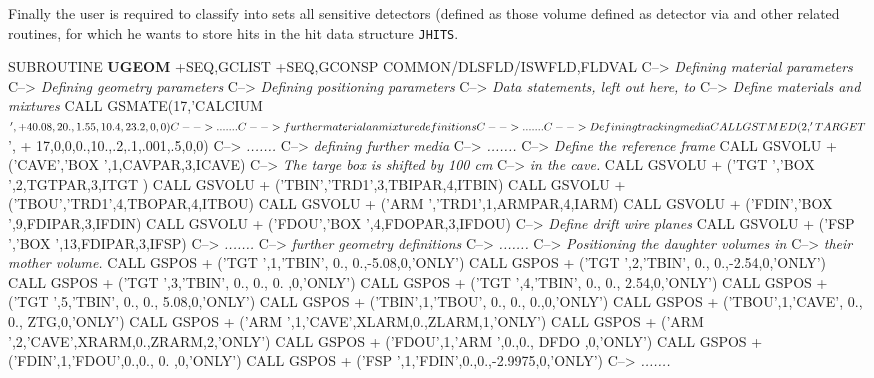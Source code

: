 \begin{itemize}
Finally the user is required to classify into sets all
sensitive detectors (defined as those volume defined as
detector via  and other related routines, for which 
he wants to store hits in the hit data structure {\tt JHITS}.
\begin{multicols}{2}
\footnotesize
\begin{XMP}
      SUBROUTINE {\bf UGEOM}
+SEQ,GCLIST
+SEQ,GCONSP
      COMMON/DLSFLD/ISWFLD,FLDVAL
C--> {\sl Defining material parameters}
C--> {\sl Defining geometry parameters}
C--> {\sl Defining positioning parameters}
C--> {\sl Data statements, left out here, to}
C--> {\sl Define materials and mixtures}
      CALL GSMATE(17,'CALCIUM$',
     + 40.08,20.,1.55,10.4,23.2,0,0)
C--> {\sl .......}
C--> {\sl further material an mixture definitions}
C--> {\sl .......}
C--> {\sl Defining tracking media}
      CALL GSTMED( 2,'TARGET    $',
     + 17,0,0,0.,10.,.2,.1,.001,.5,0,0)
C--> {\sl .......}
C--> {\sl defining further media}
C--> {\sl .......}
C--> {\sl Define the reference frame}
      CALL GSVOLU
     +     ('CAVE','BOX ',1,CAVPAR,3,ICAVE)
C--> {\sl The targe box is shifted by 100 cm}
C--> {\sl in the cave.}
      CALL GSVOLU
     +     ('TGT ','BOX ',2,TGTPAR,3,ITGT )
      CALL GSVOLU
     +     ('TBIN','TRD1',3,TBIPAR,4,ITBIN)
      CALL GSVOLU
     +     ('TBOU','TRD1',4,TBOPAR,4,ITBOU)
      CALL GSVOLU
     +     ('ARM ','TRD1',1,ARMPAR,4,IARM)
      CALL GSVOLU
     +     ('FDIN','BOX ',9,FDIPAR,3,IFDIN)
      CALL GSVOLU
     +     ('FDOU','BOX ',4,FDOPAR,3,IFDOU)
C--> {\sl Define drift wire planes}
      CALL GSVOLU
     +     ('FSP ','BOX ',13,FDIPAR,3,IFSP)
C--> {\sl .......}
C--> {\sl further geometry definitions}
C--> {\sl .......}
C--> {\sl Positioning the daughter volumes in}
C--> {\sl their mother volume.}
      CALL GSPOS
     + ('TGT ',1,'TBIN', 0., 0.,-5.08,0,'ONLY')
      CALL GSPOS
     + ('TGT ',2,'TBIN', 0., 0.,-2.54,0,'ONLY')
      CALL GSPOS
     + ('TGT ',3,'TBIN', 0., 0., 0.  ,0,'ONLY')
      CALL GSPOS
     + ('TGT ',4,'TBIN', 0., 0., 2.54,0,'ONLY')
      CALL GSPOS
     + ('TGT ',5,'TBIN', 0., 0., 5.08,0,'ONLY')
      CALL GSPOS
     + ('TBIN',1,'TBOU', 0., 0.,   0.,0,'ONLY')
      CALL GSPOS
     + ('TBOU',1,'CAVE', 0., 0.,  ZTG,0,'ONLY')
      CALL GSPOS
     + ('ARM ',1,'CAVE',XLARM,0.,ZLARM,1,'ONLY')
      CALL GSPOS
     + ('ARM ',2,'CAVE',XRARM,0.,ZRARM,2,'ONLY')
      CALL GSPOS
     + ('FDOU',1,'ARM ',0.,0., DFDO  ,0,'ONLY')
      CALL GSPOS
     + ('FDIN',1,'FDOU',0.,0., 0.    ,0,'ONLY')
      CALL GSPOS
     + ('FSP ',1,'FDIN',0.,0.,-2.9975,0,'ONLY')
C--> {\sl .......}

\end{XMP}
\end{multicols}
\end{itemize}
